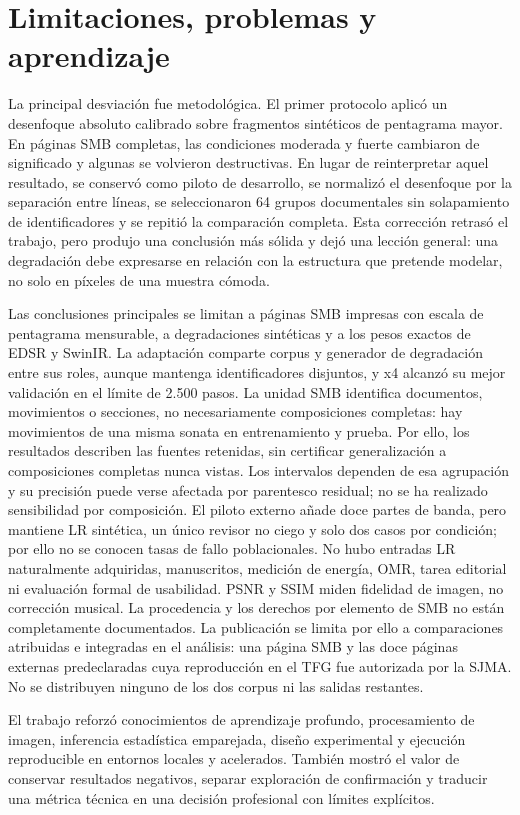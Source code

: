 \section{Limitaciones, problemas y aprendizaje}
La principal desviación fue metodológica. El primer protocolo aplicó un desenfoque absoluto
calibrado sobre fragmentos sintéticos de pentagrama mayor. En páginas SMB completas, las condiciones
moderada y fuerte cambiaron de significado y algunas se volvieron destructivas. En lugar de
reinterpretar aquel resultado, se conservó como piloto de desarrollo, se normalizó el desenfoque
por la separación entre líneas, se seleccionaron 64 grupos documentales sin solapamiento de identificadores y se repitió la
comparación completa. Esta corrección retrasó el trabajo, pero produjo una conclusión más sólida y
dejó una lección general: una degradación debe expresarse en relación con la estructura que pretende
modelar, no solo en píxeles de una muestra cómoda.

Las conclusiones principales se limitan a páginas SMB impresas con escala de pentagrama mensurable,
a degradaciones sintéticas y a los pesos exactos de EDSR y SwinIR. La adaptación comparte corpus y
generador de degradación entre sus roles, aunque mantenga identificadores disjuntos, y x4 alcanzó su mejor
validación en el límite de 2.500 pasos. La unidad SMB identifica documentos, movimientos o secciones,
no necesariamente composiciones completas: hay movimientos de una misma sonata en entrenamiento
y prueba. Por ello, los resultados describen las fuentes retenidas, sin certificar generalización
a composiciones completas nunca vistas. Los intervalos dependen de esa agrupación y su precisión
puede verse afectada por parentesco residual; no se ha realizado sensibilidad por composición.
El piloto externo añade doce partes de banda, pero mantiene
LR sintética, un único revisor no ciego y solo dos casos por condición; por ello no se conocen tasas
de fallo poblacionales. No hubo entradas LR naturalmente adquiridas, manuscritos, medición de
energía, OMR, tarea editorial ni evaluación formal de usabilidad. PSNR y SSIM miden fidelidad de
imagen, no corrección musical. La procedencia y los derechos por elemento de SMB no están
completamente documentados. La publicación se limita por ello a comparaciones atribuidas e
integradas en el análisis: una página SMB y las doce páginas externas predeclaradas cuya
reproducción en el TFG fue autorizada por la SJMA. No se distribuyen ninguno de los dos corpus ni las salidas
restantes.

El trabajo reforzó conocimientos de aprendizaje profundo, procesamiento de imagen, inferencia
estadística emparejada, diseño experimental y ejecución reproducible en entornos locales y
acelerados. También mostró el valor de conservar resultados negativos, separar exploración de
confirmación y traducir una métrica técnica en una decisión profesional con límites explícitos.

